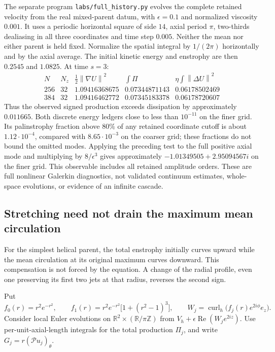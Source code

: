 \documentclass[11pt]{article}
\theoremstyle{remark}
\newcommand{\R}{\mathbb R}
\newcommand{\PP}{\mathcal P}
\newcommand{\norm}[1]{\left\lVert#1\right\rVert}
\newcommand{\curl}{\operatorname{curl}}
\begin{document}
The separate program \texttt{labs/full\_history.py} evolves the complete
retained velocity from the real mixed-parent datum, with
$\epsilon=0.1$ and normalized viscosity $0.001$. It uses a periodic
horizontal square of side $14$, axial period $\pi$, two-thirds
dealiasing in all three coordinates and time step $0.005$. Neither the
mean nor either parent is held fixed. Normalize the spatial integral by
$1/(2\pi)$ horizontally and by the axial average. The initial kinetic
energy and enstrophy are then $0.2545$ and $1.0825$. At time $s=3$:
\[
\begin{array}{c|c|r|r|r}
 N&N_z&\tfrac12\norm{\nabla U}^2&\int\Pi&
                                  \eta\int\norm{\Delta U}^2\\ \hline
 256&32&1.09416368675&0.07344871143&0.06178502469\\
 384&32&1.09416462772&0.07345183378&0.06178720607
\end{array}
\]
Thus the observed signed production exceeds dissipation by approximately
$0.011665$. Both discrete energy ledgers close to less than $10^{-11}$
on the finer grid. Its palinstrophy fraction above $80\%$ of any
retained coordinate cutoff is about $1.12\cdot10^{-4}$, compared with
$8.65\cdot10^{-3}$ on the coarser grid; these fractions do not bound
the omitted modes. Applying the preceding test to the full positive
axial mode and multiplying by $8/\epsilon^3$ gives approximately
$-1.01349505+2.95094567i$ on the finer grid. This observable includes
all retained amplitude orders. These are full nonlinear Galerkin
diagnostics, not validated continuum estimates, whole-space evolutions,
or evidence of an infinite cascade.

\subsection{Stretching need not drain the maximum mean circulation}

For the simplest helical parent, the total enstrophy initially curves
upward while the mean circulation at its original maximum curves
downward. This compensation is not forced by the equation. A change
of the radial profile, even one preserving its first two jets at that
radius, reverses the second sign.

Put
\[
 f_0(r)=r^2e^{-r^2},\qquad
 f_1(r)=r^2e^{-r^2}\big[1+(r^2-1)^3\big],\qquad
 W_j=\curl_h\big(f_j(r)e^{2i\phi}e_z\big).
\]
Consider local Euler evolutions on $\R^2\times(\R/\pi\mathbb Z)$
from $V_h+\epsilon\operatorname{Re}(W_j e^{2iz})$.
Use per-unit-axial-length integrals for the total production $\Pi_j$,
and write $G_j=r(\PP u_j)_\theta$.
\end{document}
